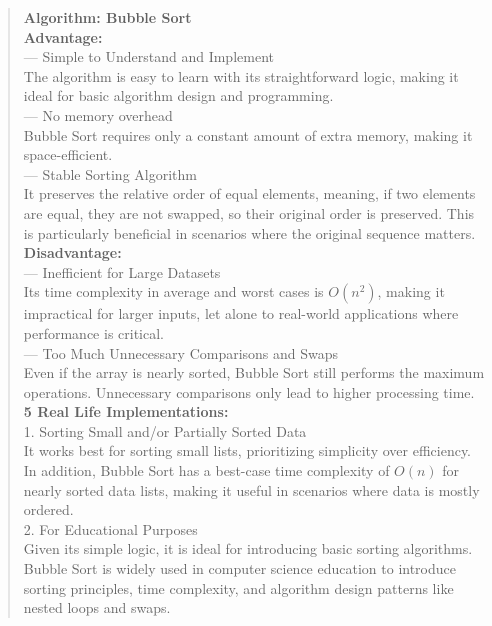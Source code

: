 \begin{quote}

    \textbf{Algorithm: Bubble Sort} \\
    
    \textbf{Advantage:} \\
    --- Simple to Understand and Implement \\
    The algorithm is easy to learn with its straightforward logic, making it ideal for basic algorithm design and programming. \\
    
    --- No memory overhead \\
    Bubble Sort requires only a constant amount of extra memory, making it space-efficient. \\
    
    --- Stable Sorting Algorithm \\
    It preserves the relative order of equal elements, meaning, if two elements are equal, they are not swapped, so their original order is preserved. This is particularly beneficial in scenarios where the original sequence matters. \\
    
    \textbf{Disadvantage:} \\
    --- Inefficient for Large Datasets \\
    Its time complexity in average and worst cases is \(O(n^2)\), making it impractical for larger inputs, let alone to real-world applications where performance is critical. \\
    
    --- Too Much Unnecessary Comparisons and Swaps \\
    Even if the array is nearly sorted, Bubble Sort still performs the maximum operations. Unnecessary comparisons only lead to higher processing time. \\
    
    \textbf{5 Real Life Implementations:} \\
    1. Sorting Small and/or Partially Sorted Data \\
    It works best for sorting small lists, prioritizing simplicity over efficiency. In addition, Bubble Sort has a best-case time complexity of \(O(n)\) for nearly sorted data lists, making it useful in scenarios where data is mostly ordered. \\
    
    2. For Educational Purposes \\
    Given its simple logic, it is ideal for introducing basic sorting algorithms. Bubble Sort is widely used in computer science education to introduce sorting principles, time complexity, and algorithm design patterns like nested loops and swaps. \\
    

\end{quote}
